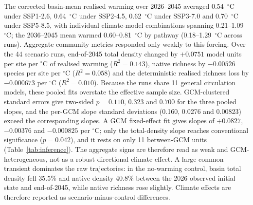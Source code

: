 \documentclass[11pt,a4paper]{article}
\begin{document}
The corrected basin-mean realised warming over 2026--2045 averaged 0.54~$^\circ$C under SSP1-2.6, 0.64~$^\circ$C under SSP2-4.5, 0.62~$^\circ$C under SSP3-7.0 and 0.70~$^\circ$C under SSP5-8.5, with individual climate-model combinations spanning 0.21--1.09~$^\circ$C; the 2036--2045 mean warmed 0.60--0.81~$^\circ$C by pathway (0.18--1.29~$^\circ$C across runs). Aggregate community metrics responded only weakly to this forcing. Over the 44 scenario runs, end-of-2045 total density changed by $+0.0751$ model units per site per $^\circ$C of realised warming ($R^2=0.143$), native richness by $-0.00526$ species per site per $^\circ$C ($R^2=0.058$) and the deterministic realised richness loss by $-0.000673$ per $^\circ$C ($R^2=0.010$). Because the runs share 11 general circulation models, these pooled fits overstate the effective sample size. GCM-clustered standard errors give two-sided $p=0.110$, $0.323$ and $0.700$ for the three pooled slopes, and the per-GCM slope standard deviations (0.160, 0.0276 and 0.00823) exceed the corresponding slopes. A GCM fixed-effect fit gives slopes of $+0.0827$, $-0.00376$ and $-0.000825$ per $^\circ$C; only the total-density slope reaches conventional significance ($p=0.042$), and it rests on only 11 between-GCM units (Table~\ref{tab:inference}). The aggregate signs are therefore read as weak and GCM-heterogeneous, not as a robust directional climate effect. A large common transient dominates the raw trajectories: in the no-warming control, basin total density fell 35.5\% and native density 40.8\% between the 2026 observed initial state and end-of-2045, while native richness rose slightly. Climate effects are therefore reported as scenario-minus-control differences.
\end{document}
